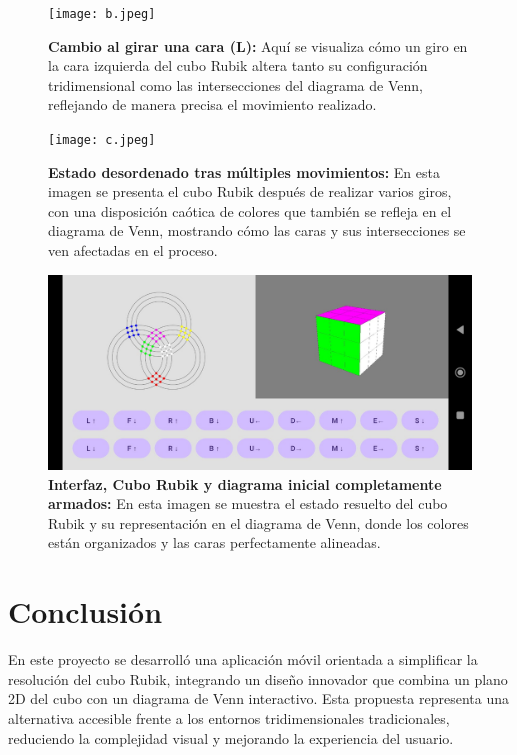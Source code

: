                                                                                                                                                                                                                                                                                                                                                                                                                                                                                                                                                                                                                                                                                                                                                                                                                                                                                                                                                                                                                                                                                                                                                                                                                                                                                                                                                                                                                                                                                                                                                                                                                                                                                                                                                                                                                                                                                                                                                                                                                                                                                                                                                                                                                                                                                                                                                                                                                                                                                                                                                                                                                                                                                                                                                                                                                                                                                                                                                                                                                                                                                                                                                                                                                                                                                                                                                                                                                                                                                                                                                                                                                                                                                                                                                                                                                                                                                                                                                                                                                                                                                                                                                                                                                                                                                                                                                                                                                                                                                                                                                                                                                                                                                                                                                                                                                                                                                                                                                                                                                                                                                                                                                                                                                                                                                                                                                                                                                                                                                                                                                                                                                                                                                                                                                                                                                                                                                                                                                                                                                                                                                                                                                                                                                                                                                                                                                                                                                                                                                                                                                                                                                                                                                                                                                                                                                                                                                                                                                                                                                                                                                                                                                                                                                                                                                                                                                                                                                                                                                                                                                                                                                                                                                                                                                                                                                                                                                                                                                                                                                                                                                                                                                                                                                                                                                                                                                                                                                                                                                                                                                                                                                                                                                                                                                                                                                                                                                                                                                                                                                                                                                                                                                                                                                                                                                                                                                                                                                                                                                                                                                                                                                                                                                                                                                                                                                                                                                                                                                                                                                                                                                                                                                                                                                                                                                                                                                                                                                                                                                                                                                                                                                                                                                                                                                                                                                                                                                                                                                                                                                                                                                                                                                                                                                                                                                                                                                                                                                                                                                                                                                                                                                                                                                                                                                                                                                                                                                                                                                                                                                                                                                                                                                                                                                                                                                                                                                                                                                                                                                                                                                                                                                                                                                                                                                                                                                                                                                                                                                                                                                                                                                                                                                                                                                                                                                                                                                                                                                                                                                                                                                                                                                                                                                                                                                                                                                                                                                                                                                                                                                                                                                                                                                                                                                                                                                                                                                                                                                                                                                                                                                                                                                                                                                                                                                                                                                                                                                                                                                                                                                                                                                                                                                                                                                                                                                                                                                                                                                                                                                                                                                                                                                                                                                                                                                                                                                                                                                                                                                                                                                                                                                                                                                                                                                                                                                                                                                                                                                                                                                                                                                                                                                                                                                                                                                                                                                                                                                                                                                                                                                                                                                                                                                                                                                                                                                                                                                                                                                                                                                                                                                                                                                                                                                                                                                                                                                                                                                                                                                                                                                                                                                                                                                                                                                                                                                                                                                                                                                                                                                                                                                                                                                                                                                                                                                                                                                                                                                                                                                                                                                                                                                                                                                                                                                                                                                                                                                                                                                                                                                                                                                                                                                                                                                                                                                                                                                                                                                                                                                                                                                                                                                                                                                                                                                                                                                                                                                                                                                                                                                                                                                                                                                                                                                                                                                                                                                                                                                                                                                                                                                                                                                                                                                                                                                                                                                                                                                                                                                                                                                                                                                                                                                                                                                                                                                                                                                                                                                                                                                                                                                                                                                                                                                                                                                                                                                                                                                                                                                                                                                                                                                                                                                                                                                                                                                                                                                                                                                                                                                                                                                                                                                                                                                                                                                                                                                                                                                                                                                                                                                                                                                                                                                                                                                                                                                                                                                                                                                                                                                                                                                                                                                                                                                                                                                                                                                                                                                                                                                                                                                                                                                                                                                                                                                                                                                                                                                                                                                                                                                                                                                                                                                                                                                                                                                                                                                                                                                                                                                                                                                                                                                                                                                                                                                                                                                                                                                                                                                                                                                                                                                                                                                                                                                                                                                                                                                                                                                                                                                                                                                                                                                                                                                                                                                                                                                                                                                                                                                                                                                                                                                                                                                                                                                                                                                                                                                                                                                                                                                                                                                                                                                                                                                                                                                                                                                                                                                                                                                                                                                                                                                                                                                                                                                                                                                                                                                                                                                                                                                                                                                                                                                                                                                                                                                                                                                                                                                                                                                                                                                                                                                                                                                                                                                                                                                                                                                                                                                                                                                                                                                                                                                                                                                                                                                                                                                                                                                                                                                                                                                                                                                                                                                                                                                                                                                                                                                                                                                                                                                                                                                                                                                                                                                                                                                                                                                                                                                                                                                                                                                                                                                                                                                                                                                                                                                                                                                                                                                                                                                                                                                                                                                                                                                                                                                                                                                                                                                                                                                                                                                                                                                                                                                                                                                                                                                                                                                                                                                                                                                                                                                                                                                                                                                                                                                                                                                                                                                                                                                                                                                                                                                                                                                                                                                                                                                                                                                                                                                                                                                                                                                                                                                                                                                                                                                                                                                                                                                                                                                                                                                                                                                                                                                                                                                                                                                                                                                                                                                                                                                                                                                                                                                                                                                                                                                                                                                                                                                                                                                                                                                                                                                                                                                                                                                                                                                                                                                                                                                                                                                                                                                                                                                                                                                                                                                                                                                                                                                                                                                                                                                                                                                                                                                                                                                                                                                                                                                                                                                                                                                                                                                                                                                                                                                                                                                                                                                                                                                                                                                                                                                                                                                                                                                                                                                                                                                                                                                                                                                                                                                                                                                                                                                                                                                                                                                                                                                                                                                                                                                                                                                                                                                                                                                                                                                                                                                                                                                                                                                                                                                                                                                                                                                                                                                                                                                                                                                                                                                                                                                                                                                                                                                                                                                                                                                                                                                                                                                                                                                                                                                                                                                                                                                                                                                                                                                                                                                                                                                                                                                                                                                                                                                                                                                                                                                                                                                                                                                                                                                                                                                                                                                                                                                                                                                                                                                                                                                                                                                                                                                                                                                                                                                                                                                                                                                                                                                                                                                                                                                                                                                                                                                                                                                                                                                                                                                                                                                                                                                                                                                                                                                                                                                                                                                                                                                                                                                                                                                                                                                                                                                                                                                                                                                                                                                                                                                                                                                                                                                                                                                                                                                                                                                                                                                                                                                                                                                                                                                                                                                                                                                                                                                                                                                                                                                                                                                                                                                                                                                                                                                                                                                                                                                                                                                                                                                                                                                                                                                                                                                                                                                                                                                                                                                                                                                                                                                                                                                                                                                                                                                                                                                                                                                                                                                                                                                                                                                                                                                                                                                                                                                                                                                                                                                                                                                                                                                                                                                                                                                                                                                                                                                                                                                                                                                                                                                                                                                                                                                                                                                                                                                                                                                                                                                                                                                                                                                                                                                                                                                                                                                                                                                                                \documentclass[conference]{IEEEtran}
\begin{document}
\begin{figure}[H]
    \centering
    \texttt{[image: b.jpeg]} 
    \caption{\textbf{Cambio al girar una cara (L):} Aquí se visualiza cómo un giro en la cara izquierda del cubo Rubik altera tanto su configuración tridimensional como las intersecciones del diagrama de Venn, reflejando de manera precisa el movimiento realizado.}
    \label{fig:cambio al girar}
\end{figure}

\begin{figure}[H]
    \centering
    \texttt{[image: c.jpeg]} 
    \caption{\textbf{Estado desordenado tras múltiples movimientos:} En esta imagen se presenta el cubo Rubik después de realizar varios giros, con una disposición caótica de colores que también se refleja en el diagrama de Venn, mostrando cómo las caras y sus intersecciones se ven afectadas en el proceso.}
    \label{fig:Desordenadas}
\end{figure}

\begin{figure}[H]
    \centering
    \includegraphics[width=1\linewidth]{a.jpeg} 
    \caption{\textbf{Interfaz, Cubo Rubik y diagrama inicial completamente armados:} En esta imagen se muestra el estado resuelto del cubo Rubik y su representación en el diagrama de Venn, donde los colores están organizados y las caras perfectamente alineadas.}
    \label{fig:cubo Rubik}
\end{figure}

\section{Conclusión}
En este proyecto se desarrolló una aplicación móvil orientada a simplificar la resolución del cubo Rubik, integrando un diseño innovador que combina un plano 2D del cubo con un diagrama de Venn interactivo. Esta propuesta representa una alternativa accesible frente a los entornos tridimensionales tradicionales, reduciendo la complejidad visual y mejorando la experiencia del usuario.
\end{document}
